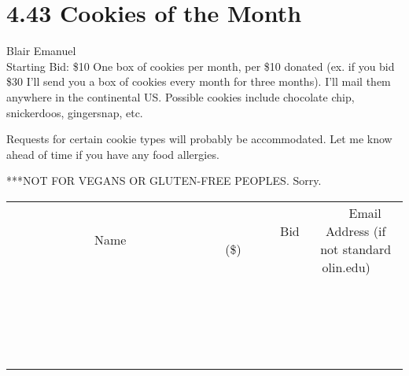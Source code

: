 \documentclass[11pt]{article}
\begin{document}
\section*{4.43 Cookies of the Month}
Blair Emanuel
\\
Starting Bid: \$10
\newline
One box of cookies per month, per \$10 donated (ex. if you bid \$30 I'll send you a box of cookies every month for three months). I'll mail them anywhere in the continental US. Possible cookies include chocolate chip, snickerdoos, gingersnap, etc. 

Requests for certain cookie types will probably be accommodated. Let me know ahead of time if you have any food allergies. 

***NOT FOR VEGANS OR GLUTEN-FREE PEOPLES. Sorry.
\\[3ex]
\begin{tabular}{c c c}
~~~~~~~~~~~~~Name~~~~~~~~~~~~~ & ~~~~~~~~~Bid (\$)~~~~~~~~~  & ~~~Email Address (if not standard olin.edu)~~~\\
 & & \\
\hline
 & & \\
\hline
 & & \\
\hline
 & & \\
\hline
 & & \\
\hline
 & & \\
\hline
 & & \\
\hline
 & & \\
\hline
 & & \\
\hline
 & & \\
\hline
 & & \\
\hline
 & & \\
\hline
 & & \\
\hline
 & & \\
\hline
 & & \\
\hline
 & & \\
\hline
 & & \\
\hline
 & & \\
\hline
 & & \\
\hline
\end{tabular}
\newpage
\end{document}
